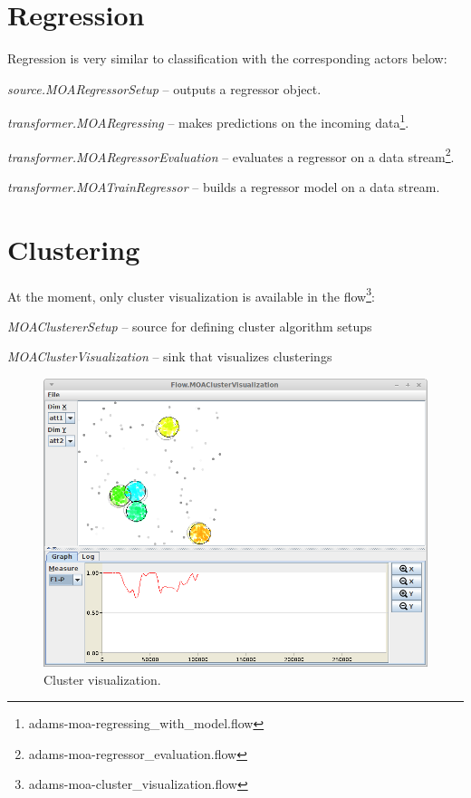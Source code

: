 \documentclass[a4paper]{book}
\begin{document}
\clearpage
\newpage
\section{Regression}
Regression is very similar to classification with the corresponding actors
below:
\begin{tight_itemize}
  \item \textit{source.MOARegressorSetup} -- outputs a regressor object.
  \item \textit{transformer.MOARegressing} -- makes predictions on the incoming
  data\footnote{adams-moa-regressing\_with\_model.flow}.
  \item \textit{transformer.MOARegressorEvaluation} -- evaluates a regressor on
  a data stream\footnote{adams-moa-regressor\_evaluation.flow}.
  \item \textit{transformer.MOATrainRegressor} -- builds a regressor model on
  a data stream.
\end{tight_itemize}

\clearpage
\newpage
\section{Clustering}
At the moment, only cluster visualization is available in the flow\footnote{adams-moa-cluster\_visualization.flow}:
\begin{tight_itemize}
  \item \textit{MOAClustererSetup} -- source for defining cluster algorithm setups
  \item \textit{MOAClusterVisualization} -- sink that visualizes clusterings
\end{tight_itemize}

\begin{figure}[htb]
  \centering
  \includegraphics[width=12.0cm]{images/moa-cluster_visualization.png}
  \caption{Cluster visualization.}
  \label{moa-cluster_visualization}
\end{figure}
\end{document}
